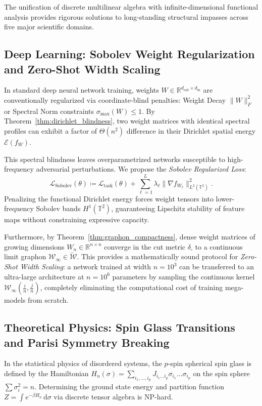 \documentclass[11pt,a4paper,reqno]{amsart}
\theoremstyle{definition}
\numberwithin{equation}{section}
\newcommand{\R}{\mathbb{R}}
\newcommand{\Tor}{\mathbb{T}}
\newcommand{\dif}{\,\mathrm{d}}
\begin{document}
The unification of discrete multilinear algebra with infinite-dimensional functional analysis provides rigorous solutions to long-standing structural impasses across five major scientific domains.

\subsection{Deep Learning: Sobolev Weight Regularization and Zero-Shot Width Scaling}
\label{subsec:imp_dl}
In standard deep neural network training, weights $W \in \R^{d_{\mathrm{out}} \times d_{\mathrm{in}}}$ are conventionally regularized via coordinate-blind penalties: Weight Decay $\|W\|_F^2$ or Spectral Norm constraints $\sigma_{\max}(W) \le 1$. By Theorem~\ref{thm:dirichlet_blindness}, two weight matrices with identical spectral profiles can exhibit a factor of $\Theta(n^2)$ difference in their Dirichlet spatial energy $\mathcal{E}(f_W)$. 

This spectral blindness leaves overparametrized networks susceptible to high-frequency adversarial perturbations. We propose the \emph{Sobolev Regularized Loss}:
\begin{equation}
    \label{eq:sobolev_loss}
    \mathcal{L}_{\mathrm{Sobolev}}(\theta) \coloneqq \mathcal{L}_{\mathrm{task}}(\theta) + \sum_{\ell=1}^L \lambda_\ell \|\nabla f_{W_\ell}\|_{L^2(\Tor^2)}^2.
\end{equation}
Penalizing the functional Dirichlet energy forces weight tensors into lower-frequency Sobolev bands $H^1(\Tor^2)$, guaranteeing Lipschitz stability of feature maps without constraining expressive capacity.

Furthermore, by Theorem~\ref{thm:graphon_compactness}, dense weight matrices of growing dimensions $W_n \in \R^{n \times n}$ converge in the cut metric $\delta_\square$ to a continuous limit graphon $\mathcal{W}_\infty \in \widetilde{\mathcal{W}}$. This provides a mathematically sound protocol for \emph{Zero-Shot Width Scaling}: a network trained at width $n = 10^3$ can be transferred to an ultra-large architecture at $n = 10^6$ parameters by sampling the continuous kernel $\mathcal{W}_\infty(\frac{i}{n}, \frac{j}{n})$, completely eliminating the computational cost of training mega-models from scratch.

\subsection{Theoretical Physics: Spin Glass Transitions and Parisi Symmetry Breaking}
\label{subsec:imp_physics}
In the statistical physics of disordered systems, the $p$-spin spherical spin glass is defined by the Hamiltonian $H_n(\sigma) = \sum_{i_1, \dots, i_p} J_{i_1 \dots i_p} \sigma_{i_1} \dots \sigma_{i_p}$ on the spin sphere $\sum \sigma_i^2 = n$. Determining the ground state energy and partition function $Z = \int e^{-\beta H_n} \dif \sigma$ via discrete tensor algebra is NP-hard.
\end{document}
